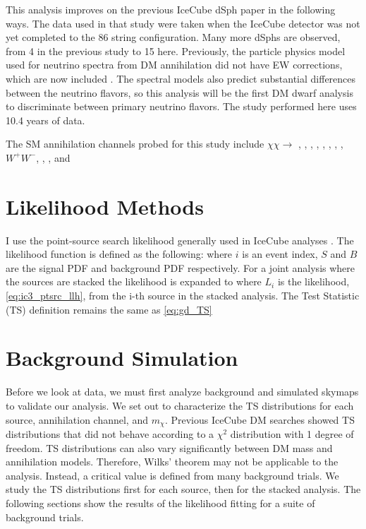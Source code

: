 This analysis improves on the previous IceCube dSph paper \cite{IC3_DM2013} in the following ways.
The data used in that study were taken when the IceCube detector was not yet completed to the 86 string configuration.
Many more dSphs are observed, from 4 in the previous study to 15 here.
Previously, the particle physics model used for neutrino spectra from DM annihilation did not have EW corrections, which are now included \cite{Rodd:HDM_spec}.
The spectral models also predict substantial differences between the neutrino flavors, so this analysis will be the first DM dwarf analysis to discriminate between primary neutrino flavors.
The study performed here uses 10.4 years of data.

The SM annihilation channels probed for this study include $\chi\chi \rightarrow$
, , , , , \parpar{\mu}, \parpar{\tau}, , $W^+W^-$, , \parpar{\nu_\mu}, and \parpar{\nu_\tau}

\section{Likelihood Methods}\label{sec:icDM_LLH}

I use the point-source search likelihood generally used in IceCube analyses \cite{IC_NGC1068}.
The likelihood function is defined as the following:
\icPtSrcLLH
where  $ i $ is an event index, $S$ and $B$ are the signal PDF and background PDF respectively. For a joint analysis where the sources are stacked the likelihood is expanded to
\icStackLLH
where $ L_i $ is the likelihood, \cref{eq:ic3_ptsrc_llh}, from the i-th source in the stacked analysis.
The Test Statistic (TS) definition remains the same as \cref{eq:gd_TS}

\section{Background Simulation}\label{sec:icDM_bkgd_sim}

Before we look at data, we must first analyze background and simulated skymaps to validate our analysis.
We set out to characterize the TS distributions for each source, annihilation channel, and $m_\chi$.
Previous IceCube DM searches \cite{Minjin_icrc23,IC3_nulines} showed TS distributions that did not behave according to a $\chi^2$ distribution with 1 degree of freedom.
TS distributions can also vary significantly between DM mass and annihilation models.
Therefore, Wilks' theorem may not be applicable to the analysis.
Instead, a critical value is defined from many background trials.
We study the TS distributions first for each source, then for the stacked analysis.
The following sections show the results of the likelihood fitting for a suite of background trials.


